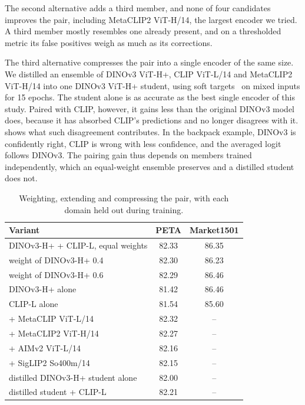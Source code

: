 \documentclass[10pt,twocolumn,letterpaper]{article}
\begin{document}
The second alternative adds a third member, and none of four candidates improves the pair, including MetaCLIP2 ViT-H/14, the largest encoder we tried. A third member mostly resembles one already present, and on a thresholded metric its false positives weigh as much as its corrections.

The third alternative compresses the pair into a single encoder of the same size. We distilled an ensemble of DINOv3 ViT-H+, CLIP ViT-L/14 and MetaCLIP2 ViT-H/14 into one DINOv3 ViT-H+ student, using soft targets~\cite{hinton} on mixed inputs for 15 epochs. The student alone is as accurate as the best single encoder of this study. Paired with CLIP, however, it gains less than the original DINOv3 model does, because it has absorbed CLIP's predictions and no longer disagrees with it.  shows what such disagreement contributes. In the backpack example, DINOv3 is confidently right, CLIP is wrong with less confidence, and the averaged logit follows DINOv3. The pairing gain thus depends on members trained independently, which an equal-weight ensemble preserves and a distilled student does not.

\begin{table}[t]
\centering\small
\setlength{\tabcolsep}{4pt}
\begin{tabular}{@{}lcc@{}}
\toprule
Variant & PETA & Market1501 \\
\midrule
DINOv3-H+ + CLIP-L, equal weights & 82.33 & 86.35 \\
\quad weight of DINOv3-H+ 0.4 & 82.30 & 86.23 \\
\quad weight of DINOv3-H+ 0.6 & 82.29 & 86.46 \\
\quad DINOv3-H+ alone & 81.42 & 86.46 \\
\quad CLIP-L alone & 81.54 & 85.60 \\
\midrule
+ MetaCLIP ViT-L/14 & 82.32 & -- \\
+ MetaCLIP2 ViT-H/14 & 82.27 & -- \\
+ AIMv2 ViT-L/14 & 82.16 & -- \\
+ SigLIP2 So400m/14 & 82.15 & -- \\
\midrule
distilled DINOv3-H+ student alone & 82.00 & -- \\
distilled student + CLIP-L & 82.21 & -- \\
\bottomrule
\end{tabular}
\caption{Weighting, extending and compressing the pair, with each domain held out during training.}
\label{tab:design}
\end{table}
\end{document}
